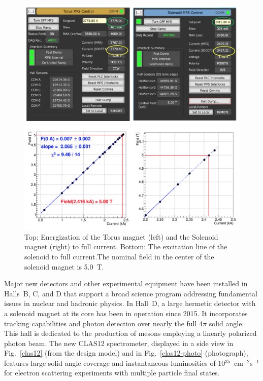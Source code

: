 \documentclass[final,3p,twocolumn]{elsarticle}
\begin{document}
\begin{figure}[h!]
\centerline{\includegraphics[width=1.8\columnwidth]{Magnets-currents.png}}
\centerline{\includegraphics[width=1.8\columnwidth]{Solenoid-current.png}}
\caption{Top: Energization of the Torus magnet (left) and the Solenoid magnet (right) to full current. Bottom: The 
excitation line of the solenoid to full current.The nominal field in the center of the solenoid magnet is 5.0~T.}
\label{Magnet-currents}
\end{figure}

Major new detectors and other experimental equipment have been installed in Halls~B, C, and D that support a
broad science program addressing fundamental issues in nuclear and hadronic physics. 
In Hall~D, a large hermetic detector with a solenoid magnet 
at its core has been in operation since 2015. It incorporates tracking capabilities and photon detection over nearly
the full $4\pi$ solid angle. This hall is dedicated to the production of mesons employing a linearly polarized photon
beam. The new CLAS12 spectrometer, displayed in a side view in Fig.~\ref{clas12} (from the design model) and in
Fig.~\ref{clas12-photo} (photograph), features large solid angle coverage and instantaneous luminosities of 
10$^{35}$~cm$^{-2}$s$^{-1}$ for electron scattering experiments with multiple particle final states. 
\end{document}

